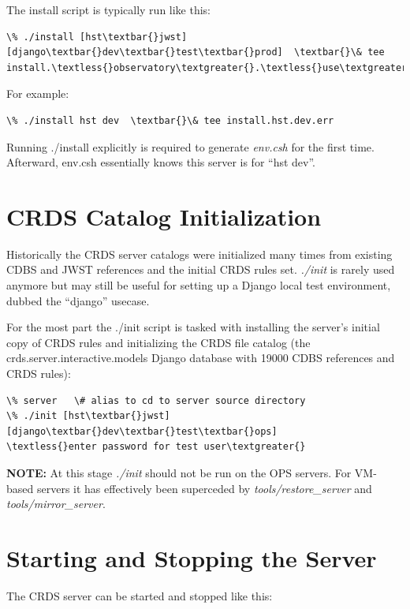 \documentclass[letterpaper,10pt,english]{sphinxmanual}
\begin{document}
The install script is typically run like this:

\begin{Verbatim}[commandchars=\\\{\}]
\% ./install [hst\textbar{}jwst]  [django\textbar{}dev\textbar{}test\textbar{}prod]  \textbar{}\& tee install.\textless{}observatory\textgreater{}.\textless{}use\textgreater{}.err
\end{Verbatim}

For example:

\begin{Verbatim}[commandchars=\\\{\}]
\% ./install hst dev  \textbar{}\& tee install.hst.dev.err
\end{Verbatim}

Running ./install explicitly is required to generate \emph{env.csh} for the first time.  Afterward,  env.csh essentially
knows this server is for ``hst dev''.


\section{CRDS Catalog Initialization}
\label{server_guide:crds-catalog-initialization}
Historically the CRDS server catalogs were initialized many times from existing CDBS and JWST references and
the initial CRDS rules set.  \emph{./init} is rarely used anymore but may still be useful for setting up a Django local
test environment, dubbed the ``django'' usecase.

For the most part the ./init script is tasked with installing the server's initial copy of CRDS rules and initializing
the CRDS file catalog (the crds.server.interactive.models Django database with 19000 CDBS references and CRDS rules):

\begin{Verbatim}[commandchars=\\\{\}]
\% server   \# alias to cd to server source directory
\% ./init [hst\textbar{}jwst] [django\textbar{}dev\textbar{}test\textbar{}ops]
\textless{}enter password for test user\textgreater{}
\end{Verbatim}

\textbf{NOTE:}  At this stage \emph{./init} should not be run on the OPS servers.   For VM-based servers it
has effectively been superceded by \emph{tools/restore\_server} and \emph{tools/mirror\_server}.


\section{Starting and Stopping the Server}
\label{server_guide:starting-and-stopping-the-server}
The CRDS server can be started and stopped like this:
\end{document}

